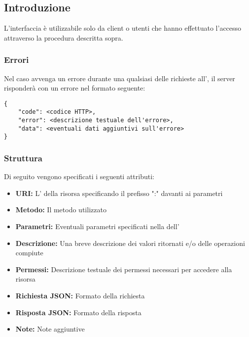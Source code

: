 \subsection{Introduzione}

    L'interfaccia  è utilizzabile solo da client o utenti che hanno effettuato l'accesso
    attraverso la procedura descritta sopra.

    \subsubsection{Errori}

        Nel caso avvenga un errore durante una qualsiasi delle richieste all', il server risponderà
        con un errore nel formato  seguente:

        \begin{lstlisting}[basicstyle={\ttfamily}]
{
    "code": <codice HTTP>,
    "error": <descrizione testuale dell'errore>,
    "data": <eventuali dati aggiuntivi sull'errore>
}
        \end{lstlisting}

    \subsubsection{Struttura}

        Di seguito vengono specificati i seguenti attributi:

        \begin{itemize}
            \item \textbf{URI:} L' della risorsa specificando il prefisso
                ":" davanti ai parametri
            \item \textbf{Metodo:} Il metodo  utilizzato
            \item \textbf{Parametri:} Eventuali parametri specificati nella 
                dell'
            \item \textbf{Descrizione:} Una breve descrizione dei valori ritornati e/o delle
                operazioni compiute
            \item \textbf{Permessi:} Descrizione testuale dei permessi necessari
                per accedere alla risorsa
            \item \textbf{Richiesta JSON:} Formato della richiesta 
            \item \textbf{Risposta JSON:} Formato della risposta 
            \item \textbf{Note:} Note aggiuntive
        \end{itemize}

